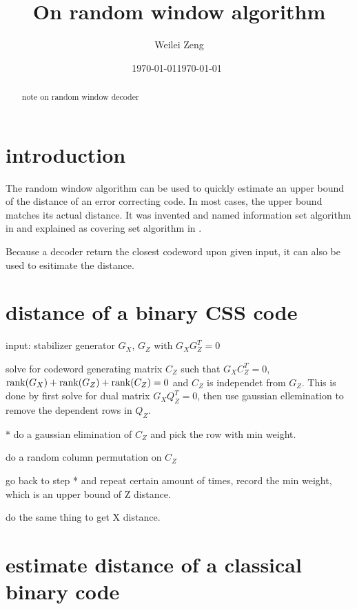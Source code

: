 \documentclass[aps,%
pra, twocolumn,%
notitlepage,longbibliography]{revtex4-2}
\begin{document}
\title{On random window algorithm}
\date\today
\date{\today\ \bf \jobname} 
\author{Weilei Zeng}

\begin{abstract}
  note on random window decoder  
\end{abstract}
\maketitle

\tableofcontents


\section{introduction}
The random window algorithm can be used to quickly estimate an upper
bound of the distance of an error correcting code. In most cases, the
upper bound matches its actual distance. It was invented and named information
set algorithm in \cite{prange1962use, chua1988cellular} and explained
as covering set
algorithm in \cite{dumer2017distance}.

Because a decoder return the closest codeword upon given input, it can
also be used to esitimate the distance.


\section{distance of a binary CSS code}

input: stabilizer generator $G_X$, $G_Z$ with $G_XG_Z^T=0$

solve for codeword generating matrix $C_Z$ such that $G_XC_Z^T=0$,
$\mathop{\rm rank}(G_X) +\mathop{\rm rank}(G_Z) + \mathop{\rm rank}(C_Z) =0$ and $C_Z$ is independet from
$G_Z$. This is done by first solve for dual matrix $G_XQ_Z^T=0$, then
use gaussian ellemination to remove the dependent rows in $Q_Z$.

* do a gaussian elimination of $C_Z$ and pick the row with min weight.

do a random column permutation on $C_Z$

go back to step * and repeat certain amount of times, record the min
weight, which is an upper bound of Z distance.

do the same thing to get X distance.



\section{estimate distance of a classical binary code}
\end{document}
